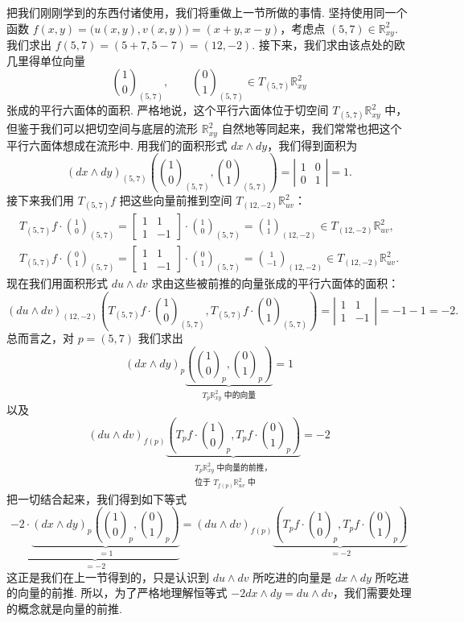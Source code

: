 把我们刚刚学到的东西付诸使用，我们将重做上一节所做的事情. 坚持使用同一个函数 $f(x,y)=\bigl(u(x,y),v(x,y)\bigr)=(x+y,x-y)$，考虑点 $(5,7)\in\mathbb{R}^2_{xy}$. 我们求出 $f(5,7)=(5+7,5-7)=(12,-2)$. 接下来，我们求由该点处的欧几里得单位向量
\[
\binom{1}{0}_{(5,7)},\qquad\binom{0}{1}_{(5,7)}\in T_{(5,7)}\mathbb{R}^2_{xy}
\]
张成的平行六面体的面积. 严格地说，这个平行六面体位于切空间 $T_{(5,7)}\mathbb{R}^2_{xy}$ 中，但鉴于我们可以把切空间与底层的流形 $\mathbb{R}^2_{xy}$ 自然地等同起来，我们常常也把这个平行六面体想成在流形中. 用我们的面积形式 $dx\wedge dy$，我们得到面积为
\[
(dx\wedge dy)_{(5,7)}\left(\binom{1}{0}_{(5,7)},\binom{0}{1}_{(5,7)}\right)=\left|\begin{matrix}1&0\\0&1\end{matrix}\right|=1.
\]
接下来我们用 $T_{(5,7)}f$ 把这些向量前推到空间 $T_{(12,-2)}\mathbb{R}^2_{uv}$：
\begin{align*}
T_{(5,7)}f\cdot\binom{1}{0}_{(5,7)}
=
\begin{bmatrix}
1&1\\
1&-1
\end{bmatrix}
\cdot\binom{1}{0}_{(5,7)}
=
\binom{1}{1}_{(12,-2)}\in T_{(12,-2)}\mathbb{R}^2_{uv}, \\
T_{(5,7)}f\cdot\binom{0}{1}_{(5,7)}
=
\begin{bmatrix}
1&1\\
1&-1
\end{bmatrix}
\cdot\binom{0}{1}_{(5,7)}
=
\binom{1}{-1}_{(12,-2)}\in T_{(12,-2)}\mathbb{R}^2_{uv}.
\end{align*}
现在我们用面积形式 $du\wedge dv$ 求由这些被前推的向量张成的平行六面体的面积：
\[
(du\wedge dv)_{(12,-2)}\left(T_{(5,7)}f\cdot\binom{1}{0}_{(5,7)},T_{(5,7)}f\cdot\binom{0}{1}_{(5,7)}\right)
=\left|\begin{matrix}1&1\\1&-1\end{matrix}\right|=-1-1=-2.
\]
总而言之，对 $p=(5,7)$ 我们求出
\[
(dx\wedge dy)_p\underbrace{\left(\binom{1}{0}_p,\binom{0}{1}_p\right)}_{\text{$T_p\mathbb{R}^2_{xy}$ 中的向量}}=1
\]
以及
\[
(du\wedge dv)_{f(p)}\underbrace{\left(T_pf\cdot\binom{1}{0}_p,T_pf\cdot\binom{0}{1}_p\right)}_{\substack{\text{$T_p\mathbb{R}^2_{xy}$ 中向量的前推，}\\\text{位于 $T_{f(p)}\mathbb{R}^2_{uv}$ 中}}}=-2
\]
把一切结合起来，我们得到如下等式
\[
\underbrace{-2\cdot\underbrace{(dx\wedge dy)_p\left(\binom{1}{0}_p,\binom{0}{1}_p\right)}_{=1}}_{=-2}
=
(du\wedge dv)_{f(p)}\underbrace{\left(T_pf\cdot\binom{1}{0}_p,T_pf\cdot\binom{0}{1}_p\right)}_{=-2}
\]
这正是我们在上一节得到的，只是认识到 $du\wedge dv$ 所吃进的向量是 $dx\wedge dy$ 所吃进的向量的前推. 所以，为了严格地理解恒等式 $-2dx\wedge dy=du\wedge dv$，我们需要处理的概念就是向量的前推.

